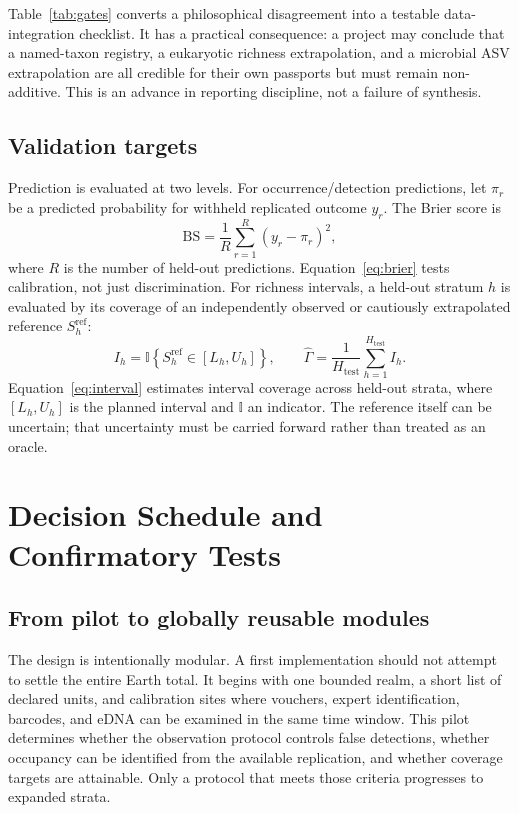 \documentclass[conference]{IEEEtran}
\begin{document}
Table~\ref{tab:gates} converts a philosophical disagreement into a testable data-integration checklist. It has a practical consequence: a project may conclude that a named-taxon registry, a eukaryotic richness extrapolation, and a microbial ASV extrapolation are all credible for their own passports but must remain non-additive. This is an advance in reporting discipline, not a failure of synthesis.

\subsection{Validation targets}

Prediction is evaluated at two levels. For occurrence/detection predictions, let $\pi_r$ be a predicted probability for withheld replicated outcome $y_r$. The Brier score is
\begin{equation}
\mathrm{BS}=\frac{1}{R}\sum_{r=1}^{R}\left(y_r-\pi_r\right)^2,
\label{eq:brier}
\end{equation}
where $R$ is the number of held-out predictions. Equation~\eqref{eq:brier} tests calibration, not just discrimination. For richness intervals, a held-out stratum $h$ is evaluated by its coverage of an independently observed or cautiously extrapolated reference $S_h^{\mathrm{ref}}$:
\begin{equation}
I_h=\mathbb{I}\left\{S_h^{\mathrm{ref}}\in[L_h,U_h]\right\}, \qquad \widehat{\Gamma}=\frac{1}{H_{\mathrm{test}}}\sum_{h=1}^{H_{\mathrm{test}}}I_h.
\label{eq:interval}
\end{equation}
Equation~\eqref{eq:interval} estimates interval coverage across held-out strata, where $[L_h,U_h]$ is the planned interval and $\mathbb{I}$ an indicator. The reference itself can be uncertain; that uncertainty must be carried forward rather than treated as an oracle.

\section{Decision Schedule and Confirmatory Tests}

\subsection{From pilot to globally reusable modules}

The design is intentionally modular. A first implementation should not attempt to settle the entire Earth total. It begins with one bounded realm, a short list of declared units, and calibration sites where vouchers, expert identification, barcodes, and eDNA can be examined in the same time window. This pilot determines whether the observation protocol controls false detections, whether occupancy can be identified from the available replication, and whether coverage targets are attainable. Only a protocol that meets those criteria progresses to expanded strata.
\end{document}
